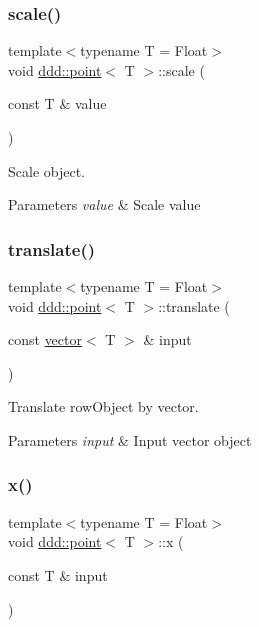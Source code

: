 \subsubsection{\texorpdfstring{scale()}{scale()}}
{\footnotesize\ttfamily template$<$typename T = Float$>$ \\
void \hyperlink{classddd_1_1point}{ddd\+::point}$<$ T $>$\+::scale (\begin{DoxyParamCaption}\item[{const T \&}]{value }\end{DoxyParamCaption})\hspace{0.3cm}{\ttfamily [inline]}}



Scale object. 


\begin{DoxyParams}{Parameters}
{\em value} & Scale value \\
\hline
\end{DoxyParams}
\mbox{\label{classddd_1_1point_a36c06fef72376a058c663dd9632ddcd0}} 
\subsubsection{\texorpdfstring{translate()}{translate()}}
{\footnotesize\ttfamily template$<$typename T = Float$>$ \\
void \hyperlink{classddd_1_1point}{ddd\+::point}$<$ T $>$\+::translate (\begin{DoxyParamCaption}\item[{const \hyperlink{classddd_1_1vector}{vector}$<$ T $>$ \&}]{input }\end{DoxyParamCaption})\hspace{0.3cm}{\ttfamily [inline]}}



Translate row\+Object by vector. 


\begin{DoxyParams}{Parameters}
{\em input} & Input vector object \\
\hline
\end{DoxyParams}
\mbox{\label{classddd_1_1point_a8da037dcca8283397e5b56e0dda9aea9}} 
\subsubsection{\texorpdfstring{x()}{x()}}
{\footnotesize\ttfamily template$<$typename T = Float$>$ \\
void \hyperlink{classddd_1_1point}{ddd\+::point}$<$ T $>$\+::x (\begin{DoxyParamCaption}\item[{const T \&}]{input }\end{DoxyParamCaption})\hspace{0.3cm}{\ttfamily [inline]}}



